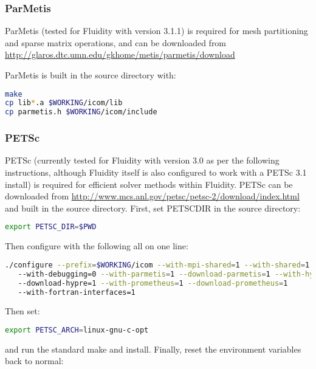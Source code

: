 \subsubsection{ParMetis}
\label{sect:required_libraries_numerical_parmetis}

ParMetis (tested for Fluidity with version 3.1.1) is required for mesh
partitioning and sparse matrix operations, and can be downloaded from
\url{http://glaros.dtc.umn.edu/gkhome/metis/parmetis/download}

ParMetis is built in the source directory with:

\begin{lstlisting}[language=bash]
make
cp lib*.a $WORKING/icom/lib
cp parmetis.h $WORKING/icom/include
\end{lstlisting}

\subsubsection{PETSc}
\label{sect:required_libraries_numerical_petsc}

PETSc (currently tested for Fluidity with version 3.0 as per the following
instructions, although Fluidity itself is also configured to work with a PETSc
3.1 install) is required for efficient solver methods within Fluidity. PETSc
can be downloaded from
\url{http://www.mcs.anl.gov/petsc/petsc-2/download/index.html} and built in the
source directory. First, set PETSC{\textunderscore}DIR in the source directory:

\begin{lstlisting}[language=bash]
export PETSC_DIR=$PWD
\end{lstlisting}

Then configure with the following all on one line:

\begin{lstlisting}[language=bash]
./configure --prefix=$WORKING/icom --with-mpi-shared=1 --with-shared=1
   --with-debugging=0 --with-parmetis=1 --download-parmetis=1 --with-hypre=1
   --download-hypre=1 --with-prometheus=1 --download-prometheus=1
   --with-fortran-interfaces=1
\end{lstlisting}

Then set:

\begin{lstlisting}[language=bash]
export PETSC_ARCH=linux-gnu-c-opt
\end{lstlisting}

and run the standard make and install. Finally, reset the environment variables
back to normal:

